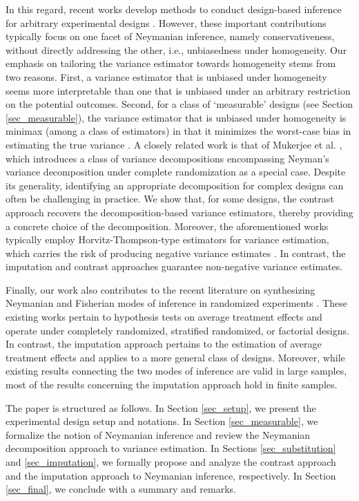 \documentclass[12pt]{article}
\begin{document}
In this regard, recent works develop methods to conduct design-based inference for arbitrary experimental designs \cite{aronow2013class, aronow2013conservative, harshaw2021optimized}. However, these important contributions typically focus on one facet of Neymanian inference, namely conservativeness, without directly addressing the other, i.e., unbiasedness under homogeneity.
Our emphasis on tailoring the variance estimator towards homogeneity stems from two reasons. First, a variance estimator that is unbiased under homogeneity seems more interpretable than one that is unbiased under an arbitrary restriction on the potential outcomes. Second, for a class of `measurable' designs (see Section \ref{sec_measurable}), the variance estimator that is unbiased under homogeneity is minimax (among a class of estimators) in that it minimizes the worst-case bias in estimating the true variance \cite{mukerjee2018using}. A closely related work is that of Mukerjee et al. \cite{mukerjee2018using}, which introduces a class of variance decompositions encompassing Neyman's variance decomposition under complete randomization as a special case. Despite its generality, identifying an appropriate decomposition for complex designs can often be challenging in practice. We show that, for some designs, the contrast approach recovers the decomposition-based variance estimators, thereby providing a concrete choice of the decomposition. Moreover, the aforementioned works typically employ Horvitz-Thompson-type estimators for variance estimation, which carries the risk of producing negative variance estimates \cite{lohr2021sampling}. In contrast, the imputation and contrast approaches guarantee non-negative variance estimates.


Finally, our work also contributes to the recent literature on synthesizing Neymanian and Fisherian modes of inference in randomized experiments \cite{ding2017paradox, ding2018randomization,  wu2021randomization}. These existing works pertain to hypothesis tests on average treatment effects and operate under completely randomized, stratified randomized, or factorial designs. In contrast, the imputation approach pertains to the estimation of average treatment effects and applies to a more general class of designs. Moreover, while existing results connecting the two modes of inference are valid in large samples, most of the results concerning the imputation approach hold in finite samples.

The paper is structured as follows. In Section \ref{sec_setup}, we present the experimental design setup and notations. In Section \ref{sec_measurable}, we formalize the notion of Neymanian inference and review the Neymanian decomposition approach to variance estimation. In Sections \ref{sec_substitution} and \ref{sec_imputation}, we formally propose and analyze the contrast approach and the imputation approach to Neymanian inference, respectively. In Section \ref{sec_final}, we conclude with a summary and remarks.
\end{document}

